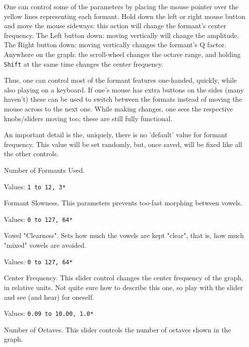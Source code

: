    One can control some of the parameters by placing the mouse pointer over
   the yellow lines representing each formant.
   Hold down the left or right mouse button and move the mouse sideways:
   this action will change the formant's center frequency.
   The Left button down: moving vertically will change the amplitude.
   The Right button down: moving vertically changes the formant's Q factor.
   Anywhere on the graph: the scroll-wheel changes the octave range, and
   holding \texttt{Shift} at the same time changes the center frequency.

   Thus, one can control most of the formant features one-handed, quickly,
   while also playing on a keyboard.
   If one's mouse has extra buttons on the sides (many haven't) these can
   be used to switch between the formats instead of moving the mouse across
   to the next one.
   While making changes, one sees the respective knobs/sliders moving
   too; these are still fully functional.

   An important detail is the, uniquely, there is no 'default' value for
   formant frequency. This value will be set randomly, but, once saved, will be
   fixed like all the other controls.

   Number of Formants Used.

   Values:  \texttt{1 to 12, 3*}

   Formant Slowness.
   This parameters prevents too-fast morphing between vowels.

   Values:  \texttt{0 to 127, 64*}

   Vowel "Clearness".
   Sets how much the vowels are kept "clear",
   that is, how much "mixed" vowels are avoided.

   Values:  \texttt{0 to 127, 64*}

   Center Frequency.
   This slider control changes the center frequency of the graph, in relative
   units.  Not quite sure how to describe this one, so play with the slider and
   see (and hear) for oneself.

   Values:  \texttt{0.09 to 10.00, 1.0*}

   Number of Octaves.
   This slider controls the number of octaves shown in the graph.

